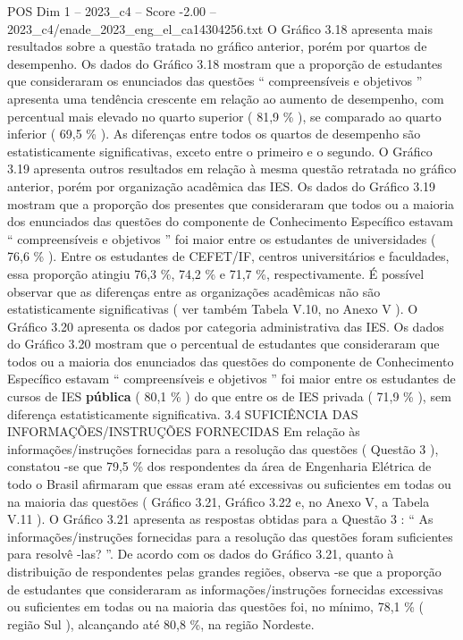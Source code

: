\begin{textsample}{POS Dim 1 – 2023\_c4 – Score -2.00 – 2023\_c4/enade\_2023\_eng\_el\_ca14304256.txt}
O Gráfico 3.18 apresenta mais resultados sobre a questão tratada no gráfico anterior, porém por quartos de desempenho.
Os dados do Gráfico 3.18 mostram que a proporção de estudantes que consideraram os enunciados das questões “ compreensíveis e objetivos ” apresenta uma tendência crescente em relação ao aumento de desempenho, com percentual mais elevado no quarto superior ( 81,9 \% ), se comparado ao quarto inferior ( 69,5 \% ).
As diferenças entre todos os quartos de desempenho são estatisticamente significativas, exceto entre o primeiro e o segundo.
O Gráfico 3.19 apresenta outros resultados em relação à mesma questão retratada no gráfico anterior, porém por organização acadêmica das IES.
Os dados do Gráfico 3.19 mostram que a proporção dos presentes que consideraram que todos ou a maioria dos enunciados das questões do componente de Conhecimento Específico estavam “ compreensíveis e objetivos ” foi maior entre os estudantes de universidades ( 76,6 \% ).
Entre os estudantes de CEFET/IF, centros universitários e faculdades, essa proporção atingiu 76,3 \%, 74,2 \% e 71,7 \%, respectivamente.
É possível observar que as diferenças entre as organizações acadêmicas não são estatisticamente significativas ( ver também Tabela V.10, no Anexo V ).
O Gráfico 3.20 apresenta os dados por categoria administrativa das IES.
Os dados do Gráfico 3.20 mostram que o percentual de estudantes que consideraram que todos ou a maioria dos enunciados das questões do componente de Conhecimento Específico estavam “ compreensíveis e objetivos ” foi maior entre os estudantes de cursos de IES \textbf{pública} ( 80,1 \% ) do que entre os de IES privada ( 71,9 \% ), sem diferença estatisticamente significativa. 3.4 SUFICIÊNCIA DAS INFORMAÇÕES/INSTRUÇÕES FORNECIDAS Em relação às informações/instruções fornecidas para a resolução das questões ( Questão 3 ), constatou -se que 79,5 \% dos respondentes da área de Engenharia Elétrica de todo o Brasil afirmaram que essas eram até excessivas ou suficientes em todas ou na maioria das questões ( Gráfico 3.21, Gráfico 3.22 e, no Anexo V, a Tabela V.11 ).
O Gráfico 3.21 apresenta as respostas obtidas para a Questão 3 : “ As informações/instruções fornecidas para a resolução das questões foram suficientes para resolvê -las? ”.
De acordo com os dados do Gráfico 3.21, quanto à distribuição de respondentes pelas grandes regiões, observa -se que a proporção de estudantes que consideraram as informações/instruções fornecidas excessivas ou suficientes em todas ou na maioria das questões foi, no mínimo, 78,1 \% ( região Sul ), alcançando até 80,8 \%, na região Nordeste.

\end{textsample}
